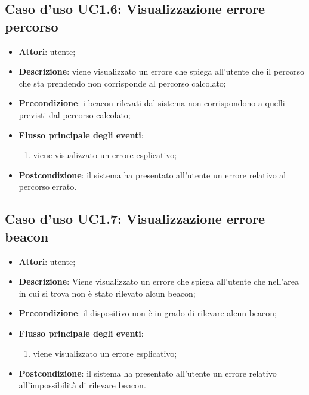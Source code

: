 \documentclass[../AnalisiDeiRequisiti.tex]{subfiles}
\begin{document}
\subsection{Caso d'uso UC1.6: Visualizzazione errore percorso}
\begin{itemize}
\item \textbf{Attori}: utente;
\item \textbf{Descrizione}: viene visualizzato un errore che spiega all'utente che il percorso che sta prendendo non corrisponde al percorso calcolato; 
      \item \textbf{Precondizione}: i beacon rilevati dal sistema non corrispondono a quelli previsti dal percorso calcolato;

        \item \textbf{Flusso principale degli eventi}:
          \begin{enumerate}
          \item viene visualizzato un errore esplicativo;

      \end{enumerate}
    \item \textbf{Postcondizione}: il sistema ha presentato all'utente un errore relativo al percorso errato.
  \end{itemize}
\hypertarget{UC1.7}{}
\subsection{Caso d'uso UC1.7: Visualizzazione errore beacon}
\begin{itemize}
\item \textbf{Attori}: utente;
\item \textbf{Descrizione}: Viene visualizzato un errore che spiega all'utente che nell'area in cui si trova non è stato rilevato alcun beacon; 
      \item \textbf{Precondizione}: il dispositivo non è in grado di rilevare alcun beacon;

        \item \textbf{Flusso principale degli eventi}:
          \begin{enumerate}
          \item viene visualizzato un errore esplicativo;

      \end{enumerate}
    \item \textbf{Postcondizione}: il sistema ha presentato all'utente un errore relativo all'impossibilità di rilevare beacon.
  \end{itemize}
\hypertarget{UC2}{}
\end{document}
